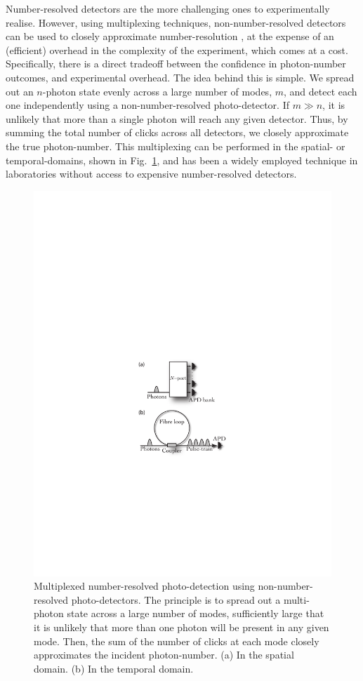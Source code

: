 \documentclass[aps,rmp,twocolumn,amsmath,amssymb,nofootinbib,superscriptaddress,longbibliography,floatfix,table-of-contents,eqsecnum]{revtex4-1}
\begin{document}
Number-resolved detectors are the more challenging ones to experimentally realise. However, using multiplexing techniques, non-number-resolved detectors can be used to closely approximate number-resolution \cite{bib:Fitch03, bib:Banaszek03, bib:Achilles04, bib:RohdeCompDet07}, at the expense of an (efficient) overhead in the complexity of the experiment, which comes at a cost. Specifically, there is a direct tradeoff between the confidence in photon-number outcomes, and experimental overhead. The idea behind this is simple. We spread out an $n$-photon state evenly across a large number of modes, $m$, and detect each one independently using a non-number-resolved photo-detector. If \mbox{$m\gg n$}, it is unlikely that more than a single photon will reach any given detector. Thus, by summing the total number of clicks across all detectors, we closely approximate the true photon-number. This multiplexing can be performed in the spatial- or temporal-domains, shown in Fig.~\ref{fig:det_mult}, and has been a widely employed technique in laboratories without access to expensive number-resolved detectors.

\begin{figure}[!htb]
\includegraphics[width=0.7\columnwidth]{detector_multiplexing}
\caption{Multiplexed number-resolved photo-detection using non-number-resolved photo-detectors. The principle is to spread out a multi-photon state across a large number of modes, sufficiently large that it is unlikely that more than one photon will be present in any given mode. Then, the sum of the number of clicks at each mode closely approximates the incident photon-number. (a) In the spatial domain. (b) In the temporal domain.} \label{fig:det_mult}
\end{figure}
\end{document}
